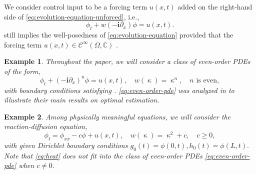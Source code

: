 \documentclass[journal,twoside,web]{ieeecolor}
\newtheorem{remark}{Remark}
\newtheorem{example}{Example}
\newcommand{\CC}{\mathbb{C}}
\newcommand{\state}{\phi}
\newcommand{\im}{\mathbf{i}}
\newcommand{\kcomplex}{\upkappa}
\begin{document}
We consider control input to be a forcing term $u(x,t)$ added on the right-hand side of \eqref{eq:evolution-equation-unforced}, i.e.,
\begin{equation}\label{eq:evolution-equation}
	\state_t + w(-\im\partial_x)\state = u(x,t).
\end{equation}
 still implies the well-posedness of \eqref{eq:evolution-equation} provided that the forcing term $u(x,t)\in\mathcal{C}^{\infty}(\Omega,\CC)$ \cite{fokas2008unified}.
\begin{example}
	\label{example:problem-formulation-even-order}
	Throughout the paper, 
	we will consider a class of even-order PDEs of the form,
	\begin{equation}\label{eq:even-order-pde}
		\state_t + (-\im \partial_x)^n\state = u(x,t),\quad w(\kcomplex) = \kcomplex^n,\quad n\text{ is even},
	\end{equation}
	with boundary conditions satisfying .
	\eqref{eq:even-order-pde} was analyzed in \cite{arbelaiz2024optimal} to illustrate their main results on optimal estimation.
\end{example}
\begin{example}\label{example:problem-formulation}
	Among physically meaningful equations, we will consider the reaction-diffusion equation,
		\begin{equation}\label{eq:heat}
			\state_t = \state_{xx} - c\state + u(x,t),\quad w(\kcomplex) = \kcomplex^2 + c, \quad c\geq0,
		\end{equation}
		with
		given Dirichlet boundary conditions $g_0(t)=\state(0,t),h_0(t)=\state(L,t).$
		Note that \eqref{eq:heat} does not fit into the class of even-order PDEs \eqref{eq:even-order-pde} when $c\neq0$.
\end{example}
\end{document}
